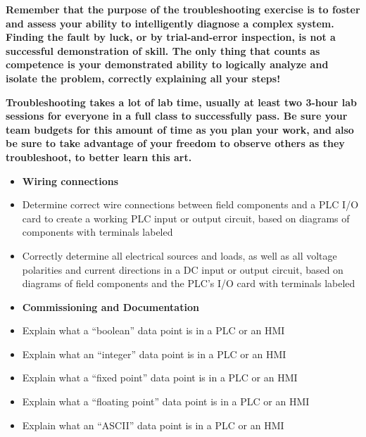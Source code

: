\vskip 10pt

{\bf Remember that the purpose of the troubleshooting exercise is to foster and assess your ability to intelligently diagnose a complex system.  Finding the fault by luck, or by trial-and-error inspection, is not a successful demonstration of skill.  The only thing that counts as competence is your demonstrated ability to logically analyze and isolate the problem, correctly explaining all your steps!}

\vskip 10pt

{\bf Troubleshooting takes a lot of lab time, usually at least two 3-hour lab sessions for everyone in a full class to successfully pass.  Be sure your team budgets for this amount of time as you plan your work, and also be sure to take advantage of your freedom to observe others as they troubleshoot, to better learn this art.}







\vfil \eject

\noindent
{} 

\begin{itemize}
\item{} {\bf Wiring connections}
\item{} Determine correct wire connections between field components and a PLC I/O card to create a working PLC input or output circuit, based on diagrams of components with terminals labeled
\item{} Correctly determine all electrical sources and loads, as well as all voltage polarities and current directions in a DC input or output circuit, based on diagrams of field components and the PLC's I/O card with terminals labeled
\end{itemize}

\filbreak

\begin{itemize}
\item{} {\bf Commissioning and Documentation}
\item{} Explain what a ``boolean'' data point is in a PLC or an HMI 
\item{} Explain what an ``integer'' data point is in a PLC or an HMI 
\item{} Explain what a ``fixed point'' data point is in a PLC or an HMI 
\item{} Explain what a ``floating point'' data point is in a PLC or an HMI 
\item{} Explain what an  ``ASCII'' data point is in a PLC or an HMI 
\end{itemize}


